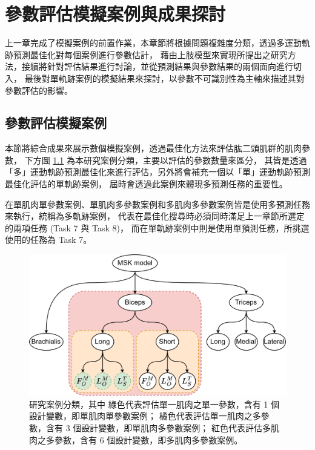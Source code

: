 \chapter{參數評估模擬案例與成果探討}
\fontsize{12pt}{18pt}\selectfont

上一章完成了模擬案例的前置作業，本章節將根據問題複雜度分類，透過多運動軌跡預測最佳化對每個案例進行參數估計，
藉由上肢模型來實現所提出之研究方法，接續將針對評估結果進行討論，並從預測結果與參數結果的兩個面向進行切入，
最後對單軌跡案例的模擬結果來探討，以參數不可識別性為主軸來描述其對參數評估的影響。

\section{參數評估模擬案例}
本節將綜合成果來展示數個模擬案例，透過最佳化方法來評估肱二頭肌群的肌肉參數，
下方圖 \ref{ch5_flowchart_StudyCase} 為本研究案例分類，主要以評估的參數數量來區分，
其皆是透過「多」運動軌跡預測最佳化來進行評估，另外將會補充一個以「單」運動軌跡預測最佳化評估的單軌跡案例，
屆時會透過此案例來體現多預測任務的重要性。

在單肌肉單參數案例、單肌肉多參數案例和多肌肉多參數案例皆是使用多預測任務來執行，統稱為多軌跡案例，
代表在最佳化搜尋時必須同時滿足上一章節所選定的兩項任務 (Task 7 與 Task 8)， 
而在單軌跡案例中則是使用單預測任務，所挑選使用的任務為 Task 7。 

\clearpage

\begin{figure}[!ht]
	\centering
	\includegraphics[width=13cm]{figure/ch5_flowchart_StudyCase.png}
    \caption[研究案例分類]{研究案例分類，其中
                          綠色代表評估單一肌肉之單一參數，含有 1 個設計變數，即單肌肉單參數案例；
                          橘色代表評估單一肌肉之多參數，含有 3 個設計變數，即單肌肉多參數案例；
                          紅色代表評估多肌肉之多參數，含有 6 個設計變數，即多肌肉多參數案例。}
    \label{ch5_flowchart_StudyCase}
\end{figure}

